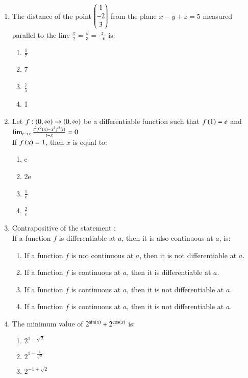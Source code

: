 \documentclass[journal]{IEEEtran}
\begin{document}
\begin{enumerate}
\begin{enumerate}
	 	\end{enumerate}
	\item
	The distance of the point $\begin{pmatrix}1 \\ -2 \\ 3\end{pmatrix}$ from the plane $x-y+z = 5$ measured parallel to the line $\frac{x}{2} = \frac{y}{3} = \frac{z}{-6}$ is:
		\begin{enumerate}
			\item $\frac{1}{7}$
			\item 7
			\item $\frac{7}{5}$
			\item 1
		\end{enumerate}
	\item
	Let $f: \left(0, \infty\right) \to \left(0, \infty\right)
$ be a differentiable function such that $f\left(1\right) = e$ and \\
	$\lim_{t \to x} \frac{t^{2}f^{2}\left(x\right)-x^{2}f^{2}\left(t\right)}{t-x} = 0$ \\
	If $f\left(x\right) = 1$, then $x$ is equal to:
		\begin{enumerate}
			\item e
			\item 2e
			\item $\frac{1}{e}$
			\item $\frac{2}{e}$
		\end{enumerate}
	\item
	Contrapositive of the statement : \\
	If a function $f$ is differentiable at $a$, then it is also continuous at $a$, is:
		\begin{enumerate}
			\item If a function $f$ is not continuous at $a$, then it is not differentiable at $a$.
			\item If a function $f$ is continuous at $a$, then it is differentiable at $a$.
			\item If a function $f$ is continuous at $a$, then it is not differentiable at $a$.
			\item If a function $f$ is continuous at $a$, then it is not differentiable at $a$.
		\end{enumerate}
	\item
	The minimum value of $2^{\sin\left(x\right)}+2^{\cos\left(x\right)}$ is:
		\begin{enumerate}
			\item $2^{1-\sqrt{2}}$
			\item $2^{1 - \frac{1}{\sqrt{2}}}$
			\item $2^{-1+\sqrt{2}}$

\end{enumerate}
\end{enumerate}
\end{document}
